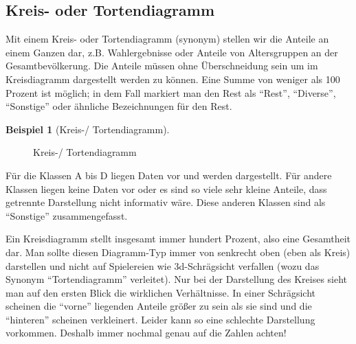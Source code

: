 \documentclass[a4paper]{book}%
\newcommand{\slice}[4]{
  \pgfmathparse{0.5*#1+0.5*#2}
  \let\midangle\pgfmathresult

  \draw[thick,fill=black!10] (0,0) -- (#1:1) arc (#1:#2:1) -- cycle;

  \node[label=\midangle:#4] at (\midangle:1) {};

  \pgfmathparse{min((#2-#1-10)/110*(-0.3),0)}
  \let\temp\pgfmathresult
  \pgfmathparse{max(\temp,-0.5) + 0.8}
  \let\innerpos\pgfmathresult
  \node at (\midangle:\innerpos) {#3};
}
\theoremstyle{definition}
\newtheorem{beispiel}{Beispiel}
\begin{document}
\subsection{Kreis- oder Tortendiagramm}

Mit einem Kreis- oder Tortendiagramm (synonym) stellen wir die Anteile an einem Ganzen dar, z.B. Wahlergebnisse oder Anteile von Altersgruppen an der Gesamtbevölkerung. Die Anteile müssen ohne Überschneidung sein um im Kreisdiagramm dargestellt werden zu können. Eine Summe von weniger als 100 Prozent ist möglich; in dem Fall markiert man den Rest als \enquote{Rest}, \enquote{Diverse}, \enquote{Sonstige} oder ähnliche Bezeichnungen für den Rest.

\begin{beispiel}[Kreis-/ Tortendiagramm]\label{bsp:Kreisdiagramm01}
    \begin{figure}
      \centering
      \caption{Kreis-/ Tortendiagramm}\label{fig:Kreisdiagramm01}
    \end{figure}

    Für die Klassen A bis D liegen Daten vor und werden dargestellt. Für andere Klassen liegen keine Daten vor oder es sind so viele sehr kleine Anteile, dass getrennte Darstellung nicht informativ wäre. Diese anderen Klassen sind als \enquote{Sonstige} zusammengefasst.
\end{beispiel}

Ein Kreisdiagramm stellt insgesamt immer hundert Prozent, also eine Gesamtheit dar. Man sollte diesen Diagramm-Typ immer von senkrecht oben (eben als Kreis) darstellen und nicht auf Spielereien wie 3d-Schrägsicht verfallen (wozu das Synonym \enquote{Tortendiagramm} verleitet). Nur bei der Darstellung des Kreises sieht man auf den ersten Blick die wirklichen Verhältnisse. In einer Schrägsicht scheinen die \enquote{vorne} liegenden Anteile größer zu sein als sie sind und die \enquote{hinteren} scheinen verkleinert. Leider kann so eine schlechte Darstellung vorkommen. Deshalb immer nochmal genau auf die Zahlen achten!
\end{document}

